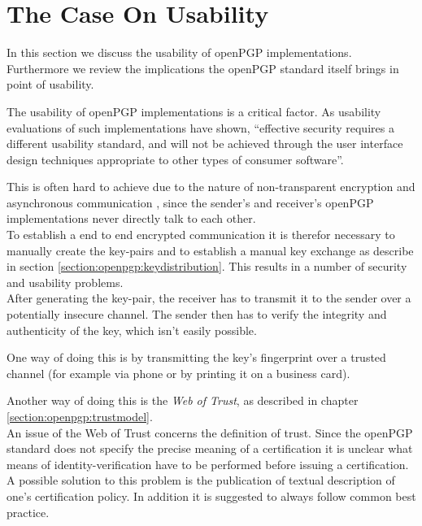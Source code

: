 
\section{The Case On Usability} \label{section:concerns:usability}

In this section we discuss the usability of openPGP implementations. Furthermore we review the implications the openPGP standard itself brings in point of usability.


The usability of openPGP implementations is a critical factor. As usability evaluations of such implementations \cite{Whitten1999} have shown, ``effective security requires a different usability standard, and will not be achieved through the user interface design techniques appropriate to other types of consumer software''.

This is often hard to achieve due to the nature of non-transparent encryption and asynchronous communication \citep[section 2.1]{RFC4880}, since the sender's and receiver's openPGP implementations never directly talk to each other. \\

To establish a end to end encrypted communication it is therefor necessary to manually create the key-pairs and to establish a manual key exchange as describe in section \ref{section:openpgp:keydistribution}. This results in a number of security and usability problems.  \\


After generating the key-pair, the receiver has to transmit it to the sender over a potentially insecure channel. The sender then has to verify the integrity and authenticity of the key, which isn't easily possible.

One way of doing this is by transmitting the key's fingerprint over a trusted channel (for example via phone or by printing it on a business card). 

Another way of doing this is the \textit{Web of Trust}, as described in chapter \ref{section:openpgp:trustmodel}. \\

An issue of the Web of Trust concerns the definition of trust. Since the openPGP standard does not specify the precise meaning of a certification it is unclear what means of identity-verification have to be performed before issuing a certification. A possible solution to this problem is the publication of textual description of one's certification policy. In addition it is suggested to always follow common best practice. 

